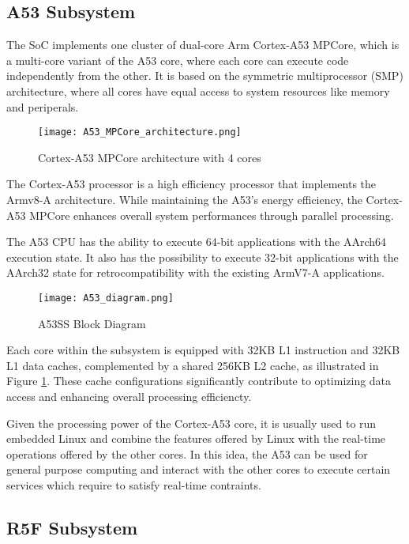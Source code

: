 \subsection{A53 Subsystem}

The SoC implements one cluster of dual-core Arm Cortex-A53 MPCore, which is
a multi-core variant of the A53 core, where each core can execute code 
independently from the other.
It is based on the symmetric multiprocessor (SMP) architecture, where all
cores have equal access to system resources like memory and periperals.


\begin{figure}[htb]
    \centering
    \texttt{[image: A53\_MPCore\_architecture.png]}
    \caption{Cortex-A53 MPCore architecture with 4 cores}
\end{figure}

The Cortex-A53 processor is a high efficiency processor that implements the
Armv8-A architecture. While maintaining the A53's energy efficiency, the
Cortex-A53 MPCore enhances overall system performances through parallel
processing.

The A53 CPU has the ability to execute 64-bit applications with the AArch64
execution state. It also has the possibility to execute 32-bit applications
with the AArch32 state for retrocompatibility with the existing ArmV7-A
applications.

\begin{figure}[htb]
    \centering
    \texttt{[image: A53\_diagram.png]}
    \caption{A53SS Block Diagram}
    \label{fig:A53_diagram}
\end{figure}

Each core within the subsystem is equipped with 32KB L1 instruction and 32KB
L1 data caches, complemented by a shared 256KB L2 cache, as illustrated in
Figure \ref{fig:A53_diagram}. These cache configurations significantly
contribute to optimizing data access and enhancing overall processing
efficiencty.

Given the processing power of the Cortex-A53 core, it is usually used to run
embedded Linux and combine the features offered by Linux with the real-time
operations offered by the other cores.
In this idea, the A53 can be used for general purpose computing and interact
with the other cores to execute certain services which require to satisfy
real-time contraints.

\subsection{R5F Subsystem}

